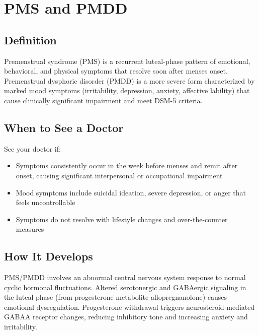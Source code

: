 \chapter{PMS and PMDD}

\section*{Definition}
Premenstrual syndrome (PMS) is a recurrent luteal-phase pattern of emotional, behavioral, and physical symptoms that resolve soon after menses onset. Premenstrual dysphoric disorder (PMDD) is a more severe form characterized by marked mood symptoms (irritability, depression, anxiety, affective lability) that cause clinically significant impairment and meet DSM-5 criteria.

\section*{When to See a Doctor}
See your doctor if:
\begin{itemize}
  \item Symptoms consistently occur in the week before menses and remit after onset, causing significant interpersonal or occupational impairment
  \item Mood symptoms include suicidal ideation, severe depression, or anger that feels uncontrollable
  \item Symptoms do not resolve with lifestyle changes and over-the-counter measures
\end{itemize}

\section*{How It Develops}
PMS/PMDD involves an abnormal central nervous system response to normal cyclic hormonal fluctuations. Altered serotonergic and GABAergic signaling in the luteal phase (from progesterone metabolite allopregnanolone) causes emotional dysregulation. Progesterone withdrawal triggers neurosteroid-mediated GABAA receptor changes, reducing inhibitory tone and increasing anxiety and irritability.

